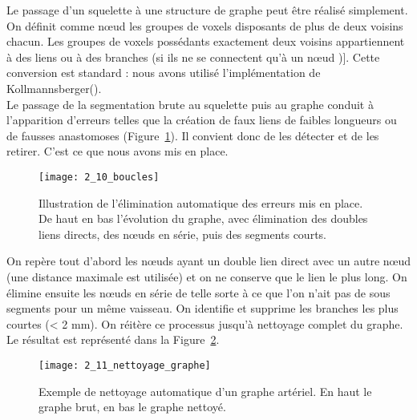 Le passage d’un squelette à une structure de graphe peut être réalisé simplement. On définit comme nœud les groupes de voxels disposants de plus de deux voisins chacun. Les groupes de voxels possédants exactement deux voisins appartiennent à des liens ou à des branches (si ils ne se connectent qu’à un nœud \cite{Kerschnitzki2013})]. Cette conversion est standard : nous avons utilisé l’implémentation de Kollmannsberger(\cite{Kerschnitzki2013}). \\
Le passage de la segmentation brute au squelette puis au graphe conduit à l’apparition d’erreurs telles que la création de faux liens de faibles longueurs ou de fausses anastomoses (Figure~\ref{fig:2_10_boucles}). Il convient donc de les détecter et de les retirer. C’est ce que nous avons mis en place.
\begin{figure}[!b]
\centering
\texttt{[image: 2\_10\_boucles]}
\caption{Illustration de l'élimination automatique des erreurs mis en place. De haut en bas l’évolution du graphe, avec élimination des doubles liens directs, des nœuds en série, puis des segments courts.}
\label{fig:2_10_boucles}	
\end{figure}	
On repère tout d’abord les nœuds ayant un double lien direct avec un autre nœud (une distance maximale est utilisée) et on ne conserve que le lien le plus long. On élimine ensuite les nœuds en série de telle sorte à ce que l’on n’ait pas de sous segments pour un même vaisseau. On identifie et supprime les branches les plus courtes (< 2 mm). On réitère ce processus jusqu’à nettoyage complet du graphe. Le résultat est représenté dans la Figure~\ref{fig:2_11_nettoyage_graphe}.\\
\begin{figure}[!t]
\centering
\texttt{[image: 2\_11\_nettoyage\_graphe]}
\caption{Exemple de nettoyage automatique d'un graphe artériel. En haut le graphe brut, en bas le graphe nettoyé.}
\label{fig:2_11_nettoyage_graphe}	
\end{figure}	

